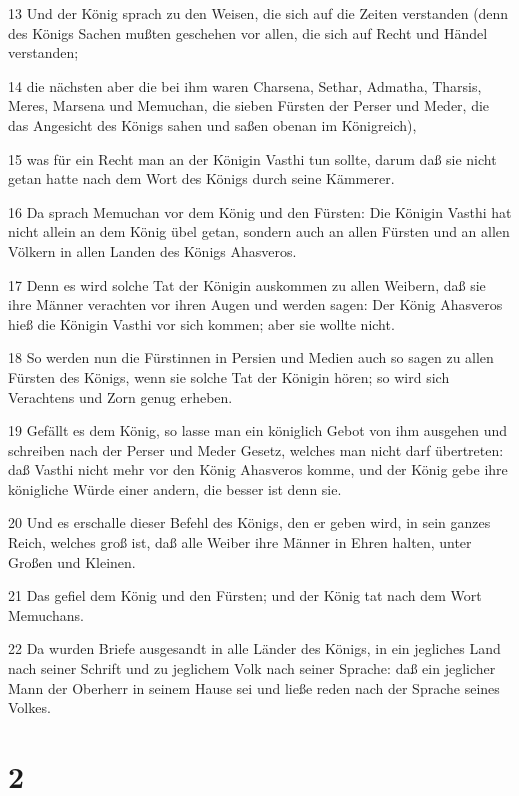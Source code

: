 \par 13 Und der König sprach zu den Weisen, die sich auf die Zeiten verstanden (denn des Königs Sachen mußten geschehen vor allen, die sich auf Recht und Händel verstanden;
\par 14 die nächsten aber die bei ihm waren Charsena, Sethar, Admatha, Tharsis, Meres, Marsena und Memuchan, die sieben Fürsten der Perser und Meder, die das Angesicht des Königs sahen und saßen obenan im Königreich),
\par 15 was für ein Recht man an der Königin Vasthi tun sollte, darum daß sie nicht getan hatte nach dem Wort des Königs durch seine Kämmerer.
\par 16 Da sprach Memuchan vor dem König und den Fürsten: Die Königin Vasthi hat nicht allein an dem König übel getan, sondern auch an allen Fürsten und an allen Völkern in allen Landen des Königs Ahasveros.
\par 17 Denn es wird solche Tat der Königin auskommen zu allen Weibern, daß sie ihre Männer verachten vor ihren Augen und werden sagen: Der König Ahasveros hieß die Königin Vasthi vor sich kommen; aber sie wollte nicht.
\par 18 So werden nun die Fürstinnen in Persien und Medien auch so sagen zu allen Fürsten des Königs, wenn sie solche Tat der Königin hören; so wird sich Verachtens und Zorn genug erheben.
\par 19 Gefällt es dem König, so lasse man ein königlich Gebot von ihm ausgehen und schreiben nach der Perser und Meder Gesetz, welches man nicht darf übertreten: daß Vasthi nicht mehr vor den König Ahasveros komme, und der König gebe ihre königliche Würde einer andern, die besser ist denn sie.
\par 20 Und es erschalle dieser Befehl des Königs, den er geben wird, in sein ganzes Reich, welches groß ist, daß alle Weiber ihre Männer in Ehren halten, unter Großen und Kleinen.
\par 21 Das gefiel dem König und den Fürsten; und der König tat nach dem Wort Memuchans.
\par 22 Da wurden Briefe ausgesandt in alle Länder des Königs, in ein jegliches Land nach seiner Schrift und zu jeglichem Volk nach seiner Sprache: daß ein jeglicher Mann der Oberherr in seinem Hause sei und ließe reden nach der Sprache seines Volkes.

\chapter{2}

